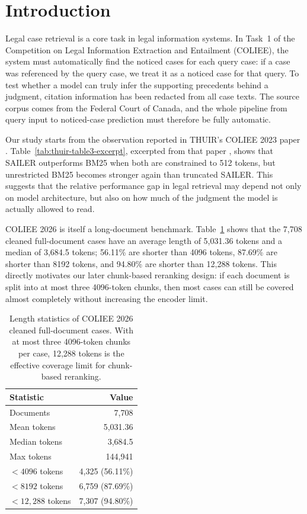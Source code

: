 \section{Introduction}

Legal case retrieval is a core task in legal information systems. In Task~1 of the Competition on Legal Information Extraction and Entailment (COLIEE), the system must automatically find the noticed cases for each query case: if a case was referenced by the query case, we treat it as a noticed case for that query. To test whether a model can truly infer the supporting precedents behind a judgment, citation information has been redacted from all case texts. The source corpus comes from the Federal Court of Canada, and the whole pipeline from query input to noticed-case prediction must therefore be fully automatic.

Our study starts from the observation reported in THUIR's COLIEE 2023 paper \cite{li2023thuir}. Table~\ref{tab:thuir-table3-excerpt}, excerpted from that paper \cite{li2023thuir}, shows that SAILER outperforms BM25 when both are constrained to 512 tokens, but unrestricted BM25 becomes stronger again than truncated SAILER. This suggests that the relative performance gap in legal retrieval may depend not only on model architecture, but also on how much of the judgment the model is actually allowed to read.

COLIEE 2026 is itself a long-document benchmark. Table~\ref{tab:length-stats} shows that the 7,708 cleaned full-document cases have an average length of 5,031.36 tokens and a median of 3,684.5 tokens; 56.11\% are shorter than 4096 tokens, 87.69\% are shorter than 8192 tokens, and 94.80\% are shorter than 12,288 tokens. This directly motivates our later chunk-based reranking design: if each document is split into at most three 4096-token chunks, then most cases can still be covered almost completely without increasing the encoder limit.

\begin{table}[t]
  \centering
  \small
  \begin{tabular}{lr}
    \toprule
    Statistic & Value \\
    \midrule
    Documents & 7,708 \\
    Mean tokens & 5,031.36 \\
    Median tokens & 3,684.5 \\
    Max tokens & 144,941 \\
    $<4096$ tokens & 4,325 (56.11\%) \\
    $<8192$ tokens & 6,759 (87.69\%) \\
    $<12,288$ tokens & 7,307 (94.80\%) \\
    \bottomrule
  \end{tabular}
  \caption{Length statistics of COLIEE 2026 cleaned full-document cases. With at most three 4096-token chunks per case, 12,288 tokens is the effective coverage limit for chunk-based reranking.}
  \label{tab:length-stats}
\end{table}

